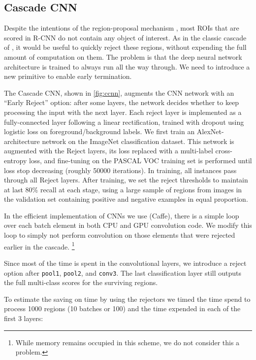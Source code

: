 \subsection{Cascade CNN}\label{sec:ccnn}

Despite the intentions of the region-proposal mechanism \cite{Uijlings-IJCV-2013}, most ROIs that are scored in R-CNN do not contain any object of interest.
As in the classic cascade of \cite{Viola-IJCV-2004}, it would be useful to quickly reject these regions, without expending the full amount of computation on them.
The problem is that the deep neural network architecture is trained to always run all the way through.
We need to introduce a new primitive to enable early termination.

The Cascade CNN, shown in \autoref{fig:ccnn}, augments the CNN network with an ``Early Reject'' option: after some layers, the network decides whether to keep processing the input with the next layer.
Each reject layer is implemented as a fully-connected layer following a linear rectification, trained with dropout using logistic loss on foreground/background labels.
We first train an AlexNet-architecture network \cite{Krizhevsky-NIPS-2012} on the ImageNet classification dataset.
This network is augmented with the Reject layers, its loss replaced with a multi-label cross-entropy loss, and fine-tuning on the PASCAL VOC training set is performed until loss stop decreasing (roughly 50000 iterations).
In training, all instances pass through all Reject layers.
After training, we set the reject thresholds to maintain at last 80\% recall at each stage, using a large sample of regions from images in the validation set containing positive and negative examples in equal proportion.

In the efficient implementation of CNNs we use (Caffe), there is a simple loop over each batch element in both CPU and GPU convolution code.
We modify this loop to simply not perform convolution on those elements that were rejected earlier in the cascade.
\footnote{While memory remains occupied in this scheme, we do not consider this a problem.}

Since most of the time is spent in the convolutional layers, we introduce a reject option after \texttt{pool1}, \texttt{pool2}, and \texttt{conv3}.
The last classification layer still outputs the full multi-class scores for the surviving regions.

To estimate the saving on time by using the rejectors we timed the time spend to process 1000 regions (10 batches or 100) and the time expended in each of the first 3 layers:

